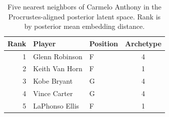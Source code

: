 \begin{table}[htbp]
  \centering\small
  \begin{tabular}{rllc}
    \toprule
    Rank & Player & Position & Archetype \\
    \midrule
    1 & Glenn Robinson & F & 4 \\
    2 & Keith Van Horn & F & 1 \\
    3 & Kobe Bryant & G & 4 \\
    4 & Vince Carter & G & 4 \\
    5 & LaPhonso Ellis & F & 1 \\
    \bottomrule
  \end{tabular}
  \caption{Five nearest neighbors of Carmelo Anthony in the Procrustes-aligned posterior latent space. Rank is by posterior mean embedding distance.}
  \label{tab:Carmelo_Anthony_neighbors}
\end{table}

